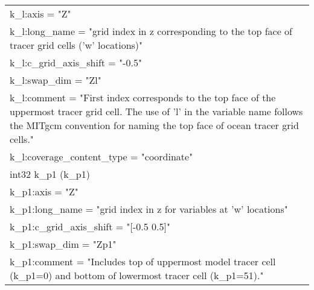 \begin{longtable}{|p{\textwidth}|}
\rowcolor{Apricot}\hspace{0.5cm}\hspace{0.5cm}k\_l:axis = "Z"\\
\rowcolor{Apricot}\hspace{0.5cm}\hspace{0.5cm}k\_l:long\_name = "grid index in z corresponding to the top face of tracer grid cells ('w' locations)"\\
\rowcolor{Apricot}\hspace{0.5cm}\hspace{0.5cm}k\_l:c\_grid\_axis\_shift = "-0.5"\\
\rowcolor{Apricot}\hspace{0.5cm}\hspace{0.5cm}k\_l:swap\_dim = "Zl"\\
\rowcolor{Apricot}\hspace{0.5cm}\hspace{0.5cm}k\_l:comment = "First index corresponds to the top face of the uppermost tracer grid cell. The use of 'l' in the variable name follows the MITgcm convention for naming the top face of ocean tracer grid cells."\\
\rowcolor{Apricot}\hspace{0.5cm}\hspace{0.5cm}k\_l:coverage\_content\_type = "coordinate"\\
\rowcolor{Apricot}\hspace{0.5cm}int32 k\_p1 (k\_p1)\\
\rowcolor{Apricot}\hspace{0.5cm}\hspace{0.5cm}k\_p1:axis = "Z"\\
\rowcolor{Apricot}\hspace{0.5cm}\hspace{0.5cm}k\_p1:long\_name = "grid index in z for variables at 'w' locations"\\
\rowcolor{Apricot}\hspace{0.5cm}\hspace{0.5cm}k\_p1:c\_grid\_axis\_shift = "[-0.5  0.5]"\\
\rowcolor{Apricot}\hspace{0.5cm}\hspace{0.5cm}k\_p1:swap\_dim = "Zp1"\\
\rowcolor{Apricot}\hspace{0.5cm}\hspace{0.5cm}k\_p1:comment = "Includes top of uppermost model tracer cell (k\_p1=0) and bottom of lowermost tracer cell (k\_p1=51)."\\

\end{longtable}
